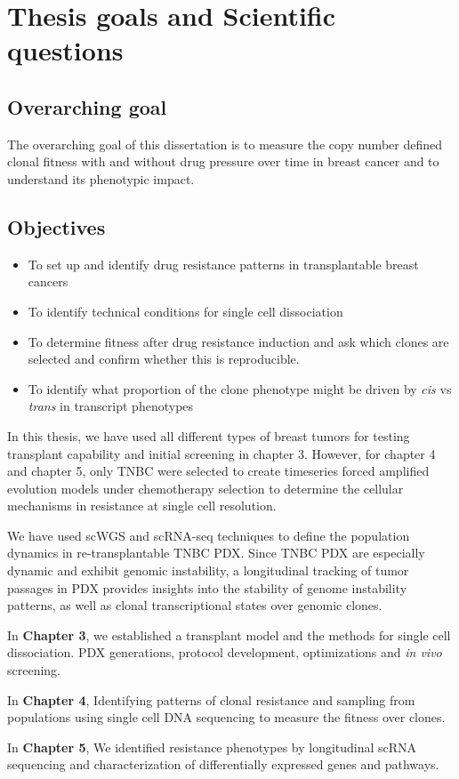 \section{Thesis goals and Scientific questions}

\subsection{Overarching goal}

The overarching goal of this dissertation is to measure the copy number defined clonal fitness with and without drug pressure over time in breast cancer and to understand its phenotypic impact.


\subsection{Objectives}
\begin{itemize}
\item{To set up and identify drug resistance patterns in transplantable breast cancers}

\item{To identify technical conditions for single cell dissociation}

\item{To determine fitness after drug resistance induction and ask which clones are selected and confirm whether this is reproducible}. 

\item{To identify what proportion of the clone phenotype might be driven by \textit{cis} vs \textit{trans} in transcript phenotypes} 

\end{itemize}

In this thesis, we have used all different types of breast tumors for testing transplant capability and initial screening in chapter 3.  However, for chapter 4 and chapter 5, only \ac{TNBC} were selected to create timeseries forced amplified evolution models under chemotherapy selection to determine the cellular mechanisms in resistance  at single cell resolution.

 We have used \ac{scWGS} and scRNA-seq techniques to define the population dynamics in re-transplantable TNBC PDX.
 Since TNBC PDX are especially dynamic and exhibit genomic instability, a longitudinal tracking of tumor passages in PDX provides insights into the stability of genome instability patterns, as well as clonal transcriptional states over genomic clones.
 
 In \textbf{Chapter 3}, we established a transplant model and the methods for single cell dissociation. PDX generations, protocol development, optimizations and \textit{in vivo} screening. 
 
 In \textbf{Chapter 4}, Identifying patterns of clonal resistance and sampling from populations using single cell DNA sequencing to measure the fitness over clones.
 
 In \textbf{Chapter 5}, We identified resistance phenotypes by longitudinal scRNA sequencing and characterization of differentially  expressed genes and pathways.

